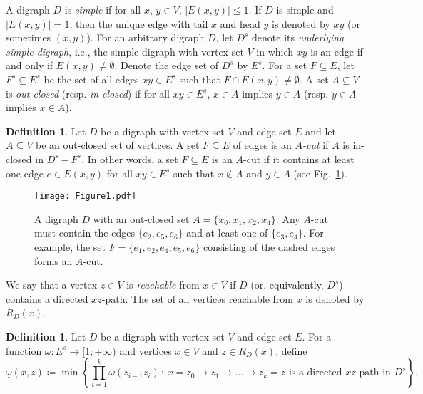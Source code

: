 \documentclass[10pt]{article}
\numberwithin{equation}{subsection}
\theoremstyle{definition}
\newtheorem{defn}[theo]{Definition}
\begin{document}
	A digraph $D$ is \emph{simple} if for all $x$, $y \in V$, $|E(x,y)| \leq 1$. If $D$ is simple and $|E(x,y)| = 1$, then the unique edge with tail $x$ and head $y$ is denoted by $xy$ (or sometimes $(x,y)$). For an arbitrary digraph $D$, let $D^s$ denote its \emph{underlying simple digraph}, i.e., the simple digraph with vertex set $V$ in which $xy$ is an edge if and only if $E(x,y) \neq \emptyset$. Denote the edge set of $D^s$ by $E^s$. For a set $F \subseteq E$, let $F^s \subseteq E^s$ be the set of all edges $xy \in E^s$ such that $F \cap E(x,y) \neq \emptyset$. A set $A \subseteq V$ is \emph{out-closed} (resp. \emph{in-closed}) if for all $xy \in E^s$, $x \in A$ implies $y \in A$ (resp. $y \in A$ implies $x \in A$).
	
	\begin{defn}
		Let $D$ be a digraph with vertex set $V$ and edge set $E$ and let $A \subseteq V$ be an out-closed set of vertices. A set $F \subseteq E$ of edges is an \emph{$A$-cut} if $A$ is in-closed in $D^s - F^s$. In other words, a set $F \subseteq E$ is an $A$-cut if it contains at least one edge $e \in E(x, y)$ for all $xy \in E^s$ such that $x \not \in A$ and $y \in A$ (see Fig.~\ref{fig:cut}).
	\end{defn}
	
	\begin{figure}[h]
		\begin{mdframed}[linewidth=0.5pt]
			\centering
			\texttt{[image: Figure1.pdf]}
		\caption{\label{fig:cut} A digraph $D$ with an out-closed set $A = \{x_0, x_1, x_2, x_4\}$. Any $A$-cut must contain the edges $\{e_2, e_5, e_6\}$ and at least one of $\{e_3, e_4\}$. For example, the set $F = \{e_1, e_2, e_4, e_5, e_6\}$ consisting of the dashed edges forms an $A$-cut.}
		\end{mdframed}
	\end{figure}
	
	We say that a vertex $z \in V$ is \emph{reachable} from $x \in V$ if $D$ (or, equivalently, $D^s$) contains a directed $xz$-path. The set of all vertices reachable from $x$ is denoted by $R_D(x)$.
	
	\begin{defn}
		Let $D$ be a digraph with vertex set $V$ and edge set $E$. For a function $\omega \colon E^s \to [1; +\infty)$ and vertices $x \in V$ and $z \in R_D(x)$, define
		$$
			\underline{\omega}(x,z) \coloneqq \min \left\{\prod_{i=1}^k \omega(z_{i-1}z_i) \,:\, \text{$x = z_0\longrightarrow z_1\longrightarrow$\ldots$\longrightarrow z_k = z$ is a directed $xz$-path in $D^s$}\right\}.
		$$
	\end{defn}
	
\end{document}
